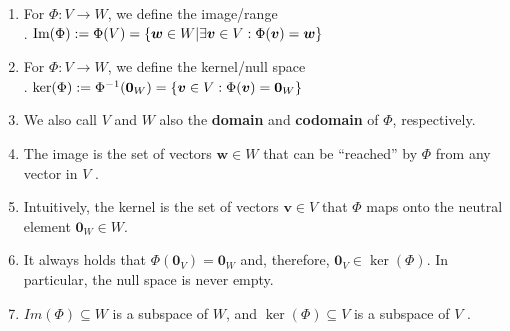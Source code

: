 \begin{enumerate}
    \item
    \begin{definition}
        For $\Phi  : V \to W$, we define the image/range
        \hfill \cite{mfml/book/mml/Deisenroth-Faisal-Ong}
        \\
        .\hfill
        $
            \text{Im}(\Phi ) 
            := \Phi (V ) 
            = \left\{\bm{w} \in W|\exists \bm{v} \in V : \Phi (\bm{v}) = \bm{w}\right\}
        $
        \hfill \cite{mfml/book/mml/Deisenroth-Faisal-Ong}
    \end{definition}

    \item
    \begin{definition}
        For $\Phi  : V \to W$, we define the kernel/null space
        \hfill \cite{mfml/book/mml/Deisenroth-Faisal-Ong}
        \\
        .\hfill
        $
            \ker(\Phi ) 
            := \Phi ^{-1} (\bm{0}_W ) 
            = \left\{\bm{v} \in V : \Phi (\bm{v}) = \bm{0}_W \right\}
        $
        \hfill \cite{mfml/book/mml/Deisenroth-Faisal-Ong}
    \end{definition}


    \item We also call $V$ and $W$ also the \textbf{domain} and \textbf{codomain} of $\Phi$, respectively.
    \hfill \cite{mfml/book/mml/Deisenroth-Faisal-Ong}

    \item The image is the set of vectors $\bm{w} \in W$ that can be “reached” by $\Phi$ from any vector in $V$ .
    \hfill \cite{mfml/book/mml/Deisenroth-Faisal-Ong}

    \item Intuitively, the kernel is the set of vectors $\bm{v} \in V$ that $\Phi$ maps onto the neutral element $\bm{0}_W \in W$.
    \hfill \cite{mfml/book/mml/Deisenroth-Faisal-Ong}

    \item It always holds that $\Phi(\bm{0}_V ) = \bm{0}_W$ and, therefore, $\bm{0}_V \in \ker(\Phi)$. 
    In particular, the null space is never empty.
    \hfill \cite{mfml/book/mml/Deisenroth-Faisal-Ong}

    \item $Im(\Phi) \subseteq W$ is a subspace of $W$, and $\ker(\Phi) \subseteq V$ is a subspace of $V$ .
    \hfill \cite{mfml/book/mml/Deisenroth-Faisal-Ong}


\end{enumerate}
